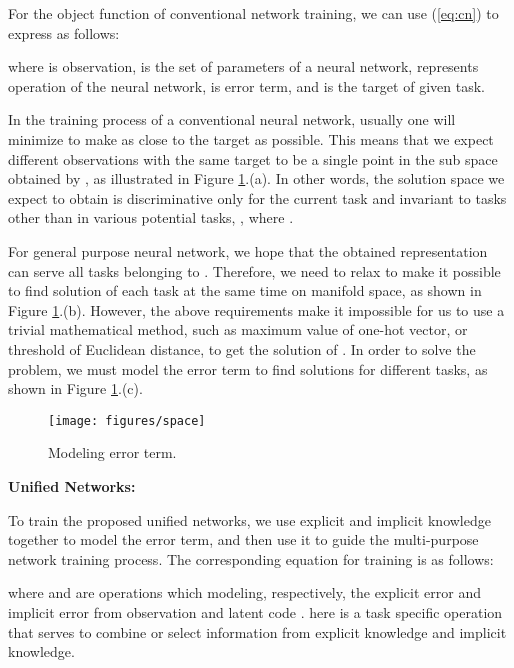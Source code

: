 \documentclass[10pt,twocolumn,letterpaper]{article}
\begin{document}
For the object function of conventional network training, we can use (\ref{eq:cn}) to express as follows:


where  is observation,  is the set of parameters of a neural network,  represents operation of the neural network,  is error term, and  is the target of given task.

In the training process of a conventional neural network, usually one will minimize  to make  as close to the target as possible. This means that we expect different observations with the same target to be a single point in the sub space obtained by , as illustrated in Figure \ref{fig:spa}.(a). In other words, the solution space we expect to obtain is discriminative only for the current task  and invariant to tasks other than  in various potential tasks, , where .

For general purpose neural network, we hope that the obtained representation can serve all tasks belonging to . Therefore, we need to relax  to make it possible to find solution of each task at the same time on manifold space, as shown in Figure \ref{fig:spa}.(b). However, the above requirements make it impossible for us to use a trivial mathematical method, such as maximum value of one-hot vector, or threshold of Euclidean distance, to get the solution of . In order to solve the problem, we must model the error term  to find solutions for different tasks, as shown in Figure \ref{fig:spa}.(c).

\begin{figure}[h]
	\vspace{-2mm}
	\begin{center}
		\texttt{[image: figures/space]}
	\end{center}
	\caption{Modeling error term.}
	\vspace{-4mm}
	\label{fig:spa}
\end{figure}

\noindent
\textbf{Unified Networks:}

To train the proposed unified networks, we use explicit and implicit knowledge together to model the error term, and then use it to guide the multi-purpose network training process. The corresponding equation for training is as follows:


where  and  are operations which modeling, respectively, the explicit error and implicit error from observation  and latent code .  here is a task specific operation that serves to combine or select information from explicit knowledge and implicit knowledge.
\end{document}
